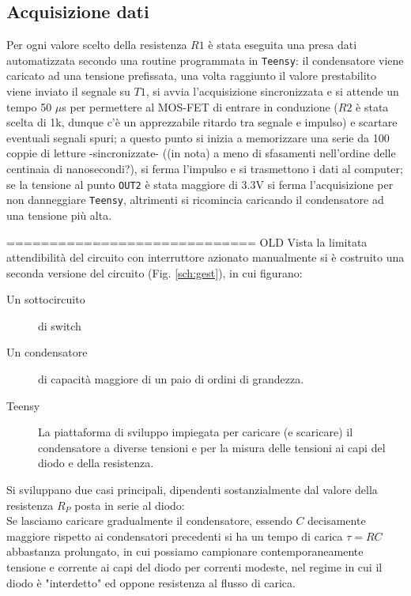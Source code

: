 \documentclass{article}[a4paper, oneside, 11pt]
\begin{document}
\subsection{Acquisizione dati}
Per ogni valore scelto della resistenza $R1$ è stata eseguita una presa dati 
automatizzata secondo una routine programmata in \verb+Teensy+: il condensatore 
viene caricato ad una tensione prefissata, una volta raggiunto il valore 
prestabilito viene inviato il segnale su $T1$, si avvia l'acquisizione 
sincronizzata e si attende un tempo 50 $\mu$s per permettere al MOS-FET di 
entrare in conduzione ($R2$ è stata scelta di 1k, dunque c'è un apprezzabile 
ritardo tra segnale e impulso) e scartare eventuali segnali spuri; a questo 
punto si inizia a memorizzare una serie da 100 coppie di letture 
-sincronizzate- ((in nota) a meno di sfasamenti nell'ordine delle centinaia di 
nanosecondi?), si ferma l'impulso e si trasmettono i dati al computer; se la 
tensione al punto \verb+OUT2+ è stata maggiore di 3.3V si ferma l'acquisizione
per non danneggiare \verb+Teensy+, altrimenti si ricomincia caricando il
condensatore ad una tensione più alta.

============================= OLD\newline
Vista la limitata attendibilità del circuito con interruttore azionato
manualmente si è costruito una seconda versione del circuito (Fig.
\ref{sch:gest}), in cui figurano: 
\begin{description}
	\item [Un sottocircuito] di switch	
	\item [Un condensatore] di capacità maggiore di un paio di ordini di 
	grandezza.
	\item [Teensy] La piattaforma di sviluppo impiegata per caricare
	(e scaricare) il condensatore a diverse tensioni e per la misura delle
	tensioni ai capi del diodo e della resistenza.
\end{description}

Si sviluppano due casi principali, dipendenti sostanzialmente dal valore della
resistenza $R_P$ posta in serie al diodo:\\

Se lasciamo caricare gradualmente il condensatore, essendo $C$ decisamente
maggiore rispetto ai condensatori precedenti si ha un tempo di carica
$\tau = RC$ abbastanza prolungato, in cui possiamo campionare contemporaneamente
tensione e corrente ai capi del diodo per correnti modeste, nel regime in cui
il diodo è "interdetto" ed oppone resistenza al flusso di carica.
\end{document}
